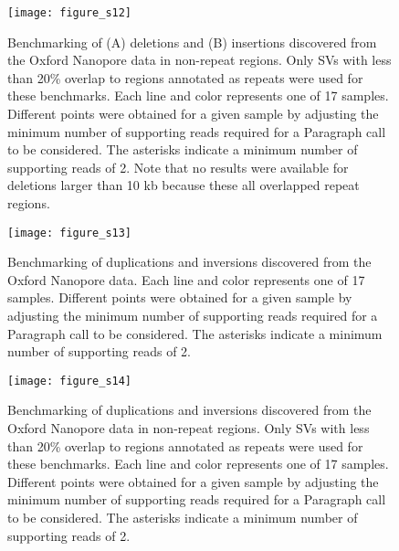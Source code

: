 \documentclass[12pt]{article}
\newenvironment{cfigure}
	{\begin{figure} \centering}
	{\end{figure}}
\newenvironment{lsfigure}
	{\begin{landscape} \begin{figure} \centering}
	{\end{figure} \end{landscape}}
\begin{document}
\begin{lsfigure}
		\texttt{[image: figure\_s12]}

		\caption[Oxford Nanopore deletion and insertion benchmarks in non-repeat regions]{
			Benchmarking of (A) deletions and (B) insertions discovered from the Oxford Nanopore data in non-repeat regions. 
			Only SVs with less than 20\% overlap to regions annotated as repeats were used for these benchmarks. 
			Each line and color represents one of 17 samples. 
			Different points were obtained for a given sample by adjusting the minimum number of supporting reads required for a Paragraph call to be considered. 
			The asterisks indicate a minimum number of supporting reads of 2.
			Note that no results were available for deletions larger than 10 kb because these all overlapped repeat regions.
	}

		\label{fig_s12}
\end{lsfigure}

\clearpage%

\begin{cfigure}
	\texttt{[image: figure\_s13]}

	\caption[Oxford Nanopore duplication and inversion benchmarks]{
		Benchmarking of duplications and inversions discovered from the Oxford Nanopore data. 
		Each line and color represents one of 17 samples. 
		Different points were obtained for a given sample by adjusting the minimum number of supporting reads required for a Paragraph call to be considered. 
		The asterisks indicate a minimum number of supporting reads of 2.
	}

	\label{fig_s13}

\end{cfigure}

\clearpage%

\begin{cfigure}
	\texttt{[image: figure\_s14]}

	\caption[Oxford Nanopore duplication and inversion benchmarks in non-repeat regions]{
		Benchmarking of duplications and inversions discovered from the Oxford Nanopore data in non-repeat regions.
		Only SVs with less than 20\% overlap to regions annotated as repeats were used for these benchmarks. 
		Each line and color represents one of 17 samples. 
		Different points were obtained for a given sample by adjusting the minimum number of supporting reads required for a Paragraph call to be considered. 
		The asterisks indicate a minimum number of supporting reads of 2.
	}

	\label{fig_s14}

\end{cfigure}
\end{document}
